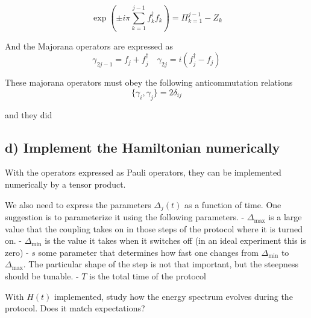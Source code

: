 \documentclass[11pt,landscape]{article}
\begin{document}
\[
\displaystyle   \exp{\left(\pm iπ ∑_{k=1}^{j-1} f_k^{†}f_k\right)} = Π_{k=1}^{j-1} -Z_k
\]

And the Majorana operators are expressed as \[
γ_{2j-1} = f_j + f_j^{†} \quad γ_{2j} = i(f_j^{†} - f_j)
\]

These majorana operators must obey the following anticommutation
relations \[
\{γ_i, γ_j\} = 2δ_{ij}
\]

and they did

    \subsection{d) Implement the Hamiltonian
numerically}\label{d-implement-the-hamiltonian-numerically}

With the operators expressed as Pauli operators, they can be implemented
numerically by a tensor product.

We also need to express the parameters \(Δ_j(t)\) as a function of time.
One suggestion is to parameterize it using the following parameters. -
\(Δ_{\max}\) is a large value that the coupling takes on in those steps
of the protocol where it is turned on. - \(Δ_{\min}\) is the value it
takes when it switches off (in an ideal experiment this is zero) - \(s\)
some parameter that determines how fast one changes from \(Δ_{\min}\) to
\(Δ_{\max}\). The particular shape of the step is not that important,
but the steepness should be tunable. - \(T\) is the total time of the
protocol

With \(H(t)\) implemented, study how the energy spectrum evolves during
the protocol. Does it match expectations?
\end{document}

